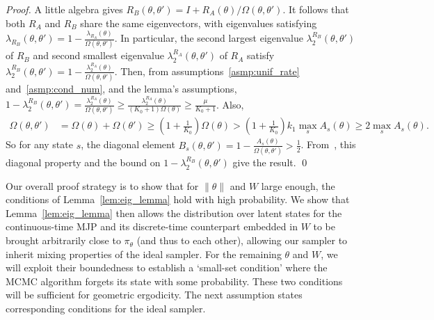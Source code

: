 \begin{proof}
A little algebra gives $R_B(\theta,\theta') = I + R_A(\theta)/\Omega(\theta,\theta')$. It 
follows that both $R_A$ and $R_B$ share the same eigenvectors, with 
eigenvalues satisfying 
$\lambda_{R_B}(\theta, \theta') = 1 - \frac{\lambda_{R_A}(\theta)}{\Omega(\theta,
\theta')}$. In particular, the second largest eigenvalue 
$\lambda_2^{R_B}(\theta,\theta')$ of $R_B$ and  
second smallest eigenvalue $\lambda^{R_A}_2(\theta,\theta')$ of $R_A$ satisfy  
$\lambda^{R_B}_2(\theta,\theta') = 1 - \frac{\lambda^{R_A}_2(\theta)}{\Omega(\theta, \theta')}$.
Then, from assumptions~\ref{asmp:unif_rate} and~\ref{asmp:cond_num}, and 
the lemma's assumptions, 
$1 - \lambda^{R_B}_2(\theta,\theta') = \frac{\lambda^{R_A}_2(\theta)}{\Omega(\theta, \theta')} 
\ge \frac{\lambda^{R_A}_2(\theta)}{(K_0+1)\Omega(\theta)} 
\ge \frac{\mu}{K_0+1} $. 
Also, 
\begin{align*}
\Omega(\theta, \theta') &= \Omega(\theta) + \Omega(\theta') \ge (1 + \frac{1}{K_0})\Omega(\theta)
 > (1 + \frac{1}{K_0})k_1\max_s A_{s}(\theta) \ge 2\max_s A_{s}(\theta). %
\end{align*}
So for any state $s$, the diagonal element $B_s(\theta, \theta') = 1 - 
\frac{A_s(\theta)}{\Omega(\theta, \theta')}> \frac{1}{2}$.
From~\cite{fill1991}, this diagonal property and the bound 
on $1-\lambda_2^{R_B}(\theta,\theta')$ give the result.
\qed
\end{proof}

Our overall proof strategy is to show that for {$\| \theta \|$} and $W$ large 
enough, the conditions of Lemma~\ref{lem:eig_lemma} hold with 
high probability. We show that Lemma~\ref{lem:eig_lemma} then allows the 
distribution over latent states for the continuous-time MJP and its 
discrete-time counterpart embedded in $W$ to be brought arbitrarily 
close to $\pi_\theta$ (and thus to each other), allowing our sampler 
to inherit mixing properties of the ideal sampler. For the remaining 
$\theta$ and $W$, we will exploit their boundedness to establish a 
`small-set condition' where the MCMC algorithm forgets its state with 
some probability. These two conditions will be sufficient for 
geometric ergodicity. The next assumption states corresponding conditions 
for the ideal sampler.


